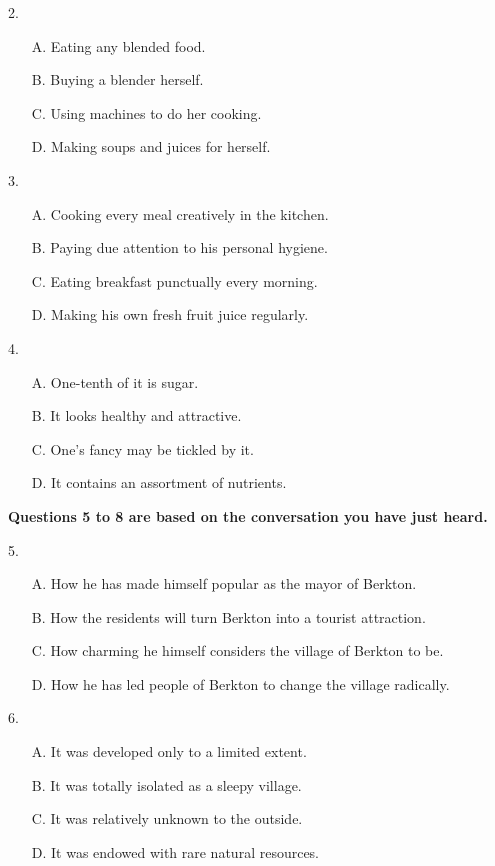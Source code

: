 \documentclass[UTF8,11pt]{ctexart}
\begin{document}
2.


\begin{itemize}[leftmargin=2em,itemsep=.2em,topsep=.4em]\item[A.] Eating any blended food.
\item[B.] Buying a blender herself.
\item[C.] Using machines to do her cooking.
\item[D.] Making soups and juices for herself.
\end{itemize}

3.


\begin{itemize}[leftmargin=2em,itemsep=.2em,topsep=.4em]\item[A.] Cooking every meal creatively in the kitchen.
\item[B.] Paying due attention to his personal hygiene.
\item[C.] Eating breakfast punctually every morning.
\item[D.] Making his own fresh fruit juice regularly.
\end{itemize}

4.


\begin{itemize}[leftmargin=2em,itemsep=.2em,topsep=.4em]\item[A.] One-tenth of it is sugar.
\item[B.] It looks healthy and attractive.
\item[C.] One’s fancy may be tickled by it.
\item[D.] It contains an assortment of nutrients.
\end{itemize}

\textbf{Questions 5 to 8 are based on the conversation you have just heard.}


5.


\begin{itemize}[leftmargin=2em,itemsep=.2em,topsep=.4em]\item[A.] How he has made himself popular as the mayor of Berkton.
\item[B.] How the residents will turn Berkton into a tourist attraction.
\item[C.] How charming he himself considers the village of Berkton to be.
\item[D.] How he has led people of Berkton to change the village radically.
\end{itemize}

6.


\begin{itemize}[leftmargin=2em,itemsep=.2em,topsep=.4em]\item[A.] It was developed only to a limited extent.
\item[B.] It was totally isolated as a sleepy village.
\item[C.] It was relatively unknown to the outside.
\item[D.] It was endowed with rare natural resources.
\end{itemize}
\end{document}
